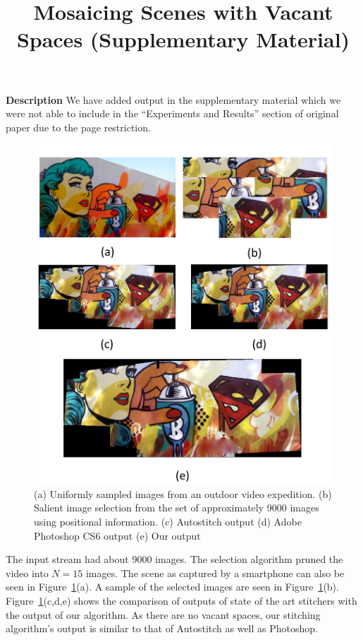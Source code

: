 \documentclass[10pt,twocolumn,letterpaper]{article}
\begin{document}
\title{Mosaicing Scenes with Vacant Spaces (Supplementary Material)}

\maketitle

\textbf{Description}
We have added output in the supplementary material which we were not able
to include in the ``Experiments and Results'' section of original paper due to
the page restriction.  

\begin{figure}[h!]
\centering
\includegraphics[width=0.87\linewidth]{figures/sac1.pdf}
\caption{ (a) Uniformly sampled images from an outdoor video
  expedition.  (b) Salient image selection from the set of
  approximately 9000 images using positional information. (c) Autostitch output
  (d) Adobe Photoshop CS6 output (e) Our output }
\label{fig:validResults}
\end{figure}

The input stream had about 9000 images. The selection
algorithm pruned the video into $N=15$ images. The scene as captured by a smartphone can also be seen in
Figure~\ref{fig:validResults}(a). A sample of the
selected images are seen in Figure~\ref{fig:validResults}(b).
Figure~\ref{fig:validResults}(c,d,e) shows the comparison of outputs of state
of the art stitchers with the output of our algorithm. As there are no vacant
spaces, our stitching algorithm's output is similar to that of Autostitch as
well as Photoshop.
\end{document}
